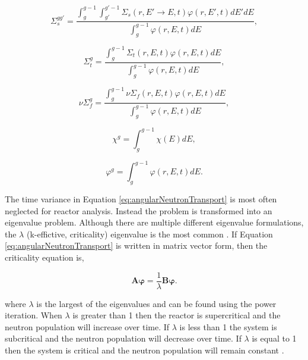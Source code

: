 \begin{equation}
    \Sigma_{s}^{gg'} = \frac{\int_{g}^{g-1}\int_{g'}^{g'-1}\Sigma_{s}(r,E'\rightarrow E,t)\varphi(r,E',t) dE'dE}{\int_{g}^{g-1}\varphi(r,E,t) dE},
\end{equation}

\begin{equation}
    \Sigma_{t}^{g} = \frac{\int_{g}^{g-1}\Sigma_{t}(r,E,t)\varphi(r,E,t) dE}{\int_{g}^{g-1}\varphi(r,E,t) dE},
\end{equation}

\begin{equation}
    \nu\Sigma_{f}^{g} = \frac{\int_{g}^{g-1}\nu\Sigma_{f}(r,E,t)\varphi(r,E,t) dE}{\int_{g}^{g-1}\varphi(r,E,t) dE},
\end{equation}

\begin{equation}
    \chi^{g} = \int_{g}^{g-1}\chi(E) dE,
\end{equation}

\begin{equation}
    \varphi^{g} = \int_{g}^{g-1}\varphi(r,E,t) dE.
\end{equation}

The time variance in Equation \ref{eq:angularNeutronTransport} is most often neglected for reactor analysis. Instead the problem is transformed into an eigenvalue problem. Although there are multiple different eigenvalue formulations, the $\lambda$ (k-effictive, criticality) eigenvalue is the most common \cite{millerCompTransport}. If Equation \ref{eq:angularNeutronTransport} is written in matrix vector form, then the criticality equation is,

\begin{equation}
    \boldsymbol{A}\boldsymbol{\varphi} = \frac{1}{\lambda}\boldsymbol{B}\boldsymbol{\varphi}.
\end{equation}

\noindent where $\lambda$ is the largest of the eigenvalues and can be found using the power iteration. When $\lambda$ is greater than 1 then the reactor is supercritical and the neutron population will increase over time. If $\lambda$ is less than 1 the system is subcritical and the neutron population will decrease over time. If $\lambda$ is equal to 1 then the system is critical and the neutron population will remain constant \cite{duderstadt1976}. 


